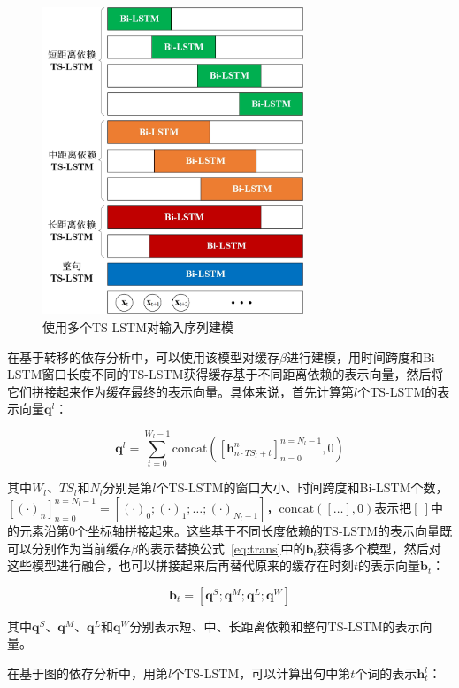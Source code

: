 \begin{figure}[hbtp]
	\centering
	\includegraphics[width=78mm]{picture/multi-ts-lstm.jpg}
	\caption{使用多个TS-LSTM对输入序列建模}
	\label{fig:multi-ts-lstm}
\end{figure}

在基于转移的依存分析中，可以使用该模型对缓存$\beta$进行建模，用时间跨度和Bi-LSTM窗口长度不同的TS-LSTM获得缓存基于不同距离依赖的表示向量，然后将它们拼接起来作为缓存最终的表示向量。具体来说，首先计算第$l$个TS-LSTM的表示向量$\mathbf{q}^l$：

\begin{equation}
\mathbf{q}^l = \sum^{W_l-1}_{t=0} \text{concat}([\mathbf{h}^{n}_{n\cdot TS_l + t}]^{n=N_l-1}_{n=0},0)
\end{equation}

其中$W_l$、$TS_l$和$N_l$分别是第$l$个TS-LSTM的窗口大小、时间跨度和Bi-LSTM个数，$[(\cdot)_n]^{n=N_l-1}_{n=0} = [(\cdot)_0;(\cdot)_1;\dots;(\cdot)_{N_l-1}]$，$\text{concat}([\dots],0)$表示把$[\ ]$中的元素沿第$0$个坐标轴拼接起来。这些基于不同长度依赖的TS-LSTM的表示向量既可以分别作为当前缓存$\beta$的表示替换公式~\ref{eq:trans}中的$\mathbf{b}_t$获得多个模型，然后对这些模型进行融合，也可以拼接起来后再替代原来的缓存在时刻$t$的表示向量$\mathbf{b}_t$：

\begin{equation}
\mathbf{b}_t = [\mathbf{q}^S;\mathbf{q}^M;\mathbf{q}^L;\mathbf{q}^W]
\end{equation}

其中$\mathbf{q}^S$、$\mathbf{q}^M$、$\mathbf{q}^L$和$\mathbf{q}^W$分别表示短、中、长距离依赖和整句TS-LSTM的表示向量。

在基于图的依存分析中，用第$l$个TS-LSTM，可以计算出句中第$t$个词的表示$\mathbf{h}^l_t$：

